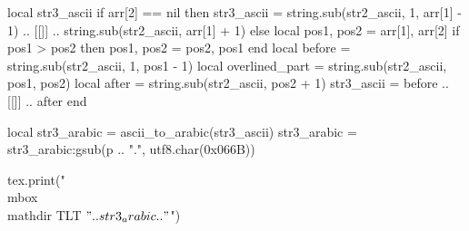 {{    local str3_ascii
    if arr[2] == nil then
        str3_ascii = string.sub(str2_ascii, 1, arr[1] - 1) .. [[\string\overline{]] .. string.sub(str2_ascii, arr[1], arr[1]) .. [[}]] .. string.sub(str2_ascii, arr[1] + 1)
    else
        local pos1, pos2 = arr[1], arr[2]
        if pos1 > pos2 then
            pos1, pos2 = pos2, pos1
        end
        local before = string.sub(str2_ascii, 1, pos1 - 1)
        local overlined_part = string.sub(str2_ascii, pos1, pos2)
        local after = string.sub(str2_ascii, pos2 + 1)
        str3_ascii = before .. [[\string\overline{]] .. overlined_part .. [[}]] .. after
    end
    
    local str3_arabic = ascii_to_arabic(str3_ascii)
    str3_arabic = str3_arabic:gsub(p .. ".", utf8.char(0x066B))
    
    tex.print("\\mbox{\\mathdir TLT $" .. str3_arabic .. "$}")
}}




\makeatletter
{}
\makeatother


\makeatletter
{}
\makeatother

\makeatletter
{}
\makeatother

